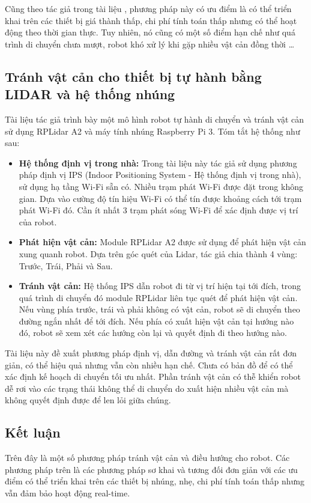 Cũng theo tác giả trong tài liệu \cite{Susnea2010}, phương pháp này có ưu điểm là có thể triển khai trên các thiết bị giá thành thấp, chi phí tính toán thấp nhưng có thể hoạt động theo thời gian thực. Tuy nhiên, nó cũng có một số điểm hạn chế như quá trình di chuyển chưa mượt, robot khó xử lý khi gặp nhiều vật cản đồng thời \dots

\subsection{Tránh vật cản cho thiết bị tự hành bằng LIDAR và hệ thống nhúng}
  Tài liệu \cite{Baras2019} tác giả trình bày một mô hình robot tự hành di chuyển và tránh vật cản sử dụng RPLidar A2 và máy tính nhúng Raspberry Pi 3. Tóm tắt hệ thống như sau:
  \begin{itemize}
    \item \textbf{Hệ thống định vị trong nhà:} Trong tài liệu này tác giả sử dụng phương pháp định vị IPS (Indoor Positioning System - Hệ thống định vị trong nhà), sử dụng hạ tầng Wi-Fi sẵn có. Nhiều trạm phát Wi-Fi được đặt trong không gian. Dựa vào cường độ tín hiệu Wi-Fi có thể tín được khoảng cách tới trạm phát Wi-Fi đó. Cần ít nhất 3 trạm phát sóng Wi-Fi để xác định được vị trí của robot.
    \item \textbf{Phát hiện vật cản:} Module RPLidar A2 được sử dụng để phát hiện vật cản xung quanh robot. Dựa trên góc quét của Lidar, tác giả chia thành 4 vùng: Trước, Trái, Phải và Sau.
    \item \textbf{Tránh vật cản:} Hệ thống IPS dẫn robot đi từ vị trí hiện tại tới đích, trong quá trình di chuyển đó module RPLidar liên tục quét để phát hiện vật cản. Nếu vùng phía trước, trái và phải không có vật cản, robot sẽ di chuyển theo đường ngắn nhất để tới đích. Nếu phía có xuất hiện vật cản tại hướng nào đó, robot sẽ xem xét các hướng còn lại và quyết định đi theo hướng nào.
  \end{itemize}
  Tài liệu này đề xuất phương pháp định vị, dẫn đường và tránh vật cản rất đơn giản, có thể hiệu quả nhưng vẫn còn nhiều hạn chế. Chưa có bản đồ để có thể xác định kế hoạch di chuyển tối ưu nhất. Phần tránh vật cản có thễ khiển robot dễ rơi vào các trạng thái không thể di chuyển do xuất hiện nhiều vật cản mà không quyết định được để len lỏi giữa chúng.

\subsection*{Kết luận}
Trên đây là một số phương pháp tránh vật cản và điều hướng cho robot. Các phương pháp trên là các phương pháp sơ khai và tương đối đơn giản với các ưu điểm có thể triển khai trên các thiết bị nhúng, nhẹ, chi phí tính toán thấp nhưng vẫn đảm bảo hoạt động real-time.

